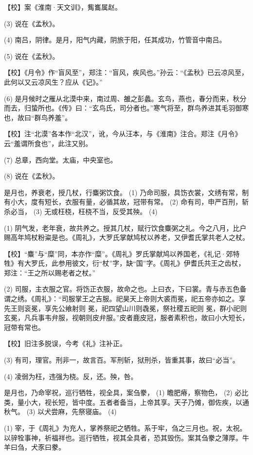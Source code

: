 \documentclass[12pt,UTF8]{ctexbook}
\begin{document}
【校】案《淮南·天文训》，觜巂属赵。

(3) 说在《孟秋》。

(4) 南吕，阴律。是月，阳气内藏，阴旅于阳，任其成功，竹管音中南吕。

(5) 说在《孟秋》。

【校】《月令》作“盲风至”，郑注：“盲风，疾风也。”孙云：“《孟秋》已云凉风至，此何以又云凉风生？应从《记》。”

(6) 是月候时之雁从北漠中来，南过周、雒之彭蠡。玄鸟，燕也，春分而来，秋分而去，归蛰所也。《传》曰：“玄鸟氏，司分者也。”寒气将至，群鸟养进其毛羽御寒也，故曰“群鸟养羞”。

【校】注“北漠”各本作“北汉”，讹，今从汪本，与《淮南》注合。郑注《月令》云“羞谓所食也”，此注又别。

(7) 总章，西向堂。太庙，中央室也。

(8) 说在《孟秋》。

是月也，养衰老，授几杖，行麋粥饮食。 (1) 乃命司服，具饬衣裳，文绣有常，制有小大，度有短长，衣服有量，必循其故，冠带有常。 (2) 命有司，申严百刑，斩杀必当， (3) 无或枉桡，枉桡不当，反受其殃。 (4)

(1) 阴气发，老年衰，故共养之。授其几杖，赋行饮食麋粥之礼。今之八月，比户赐高年鸠杖粉粢是也。《周礼》，大罗氏掌献鸠杖以养老，又伊耆氏掌共老人之杖。

【校】“麋”与“糜”同，本亦作“糜”。《周礼》罗氏掌献鸠以养国老，《礼记·郊特牲》有大罗氏，此参用彼文，衍“杖”字，缺“国”字。《周礼》伊耆氏共王之齿杖，郑注：“王之所以赐老者之杖。”

(2) 司服，主衣服之官。将饬正衣服，故命之也。上曰衣，下曰裳。青与赤五色备谓之绣。《周礼》：“司服掌王之吉服。祀昊天上帝则大裘而冕，祀五帝亦如之。享先王则衮冕，享先公飨射则 冕，祀四望山川则毳冕，祭社稷五祀则 冕，群小祀则玄冕，凡兵事韦弁服，视朝则皮弁服。”皮者鹿皮冠，服者素积也，故曰小大短长，冠带有常也。

【校】旧注多脱误，今考《礼》注补正。

(3) 有司，理官。刑非一，故言百。军刑斩，狱刑杀，皆重其事，故曰“必当”。

(4) 凌弱为枉，违强为桡。反，还。殃，咎。

是月也，乃命宰祝，巡行牺牲，视全具，案刍豢， (1) 瞻肥瘠，察物色， (2) 必比类，量小大，视长短，皆中度。五者者备当，上帝其享。天子乃傩，御佐疾，以通秋气。 (3) 以犬尝麻，先祭寝庙。 (4)

(1) 宰，于《周礼》为充人，掌养祭祀之牺牲。系于牢，刍之三月也。祝，太祝。以骍牷事神，祈福祥也。巡行牺牲，视其全具者，恐其毁伤。案其刍豢之薄厚。牛羊曰刍，犬豕曰豢。
\end{document}
